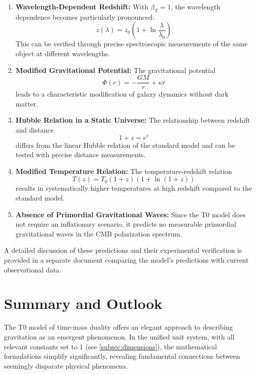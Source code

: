\documentclass[12pt,a4paper]{article}
\newcommand{\betaT}{\beta_{\text{T}}}
\begin{document}
	\begin{enumerate}
		\item \textbf{Wavelength-Dependent Redshift:} With \(\betaT = 1\), the wavelength dependence becomes particularly pronounced:
		\begin{equation}
			z(\lambda) = z_0 \left(1 + \ln \frac{\lambda}{\lambda_0}\right)
		\end{equation}
		This can be verified through precise spectroscopic measurements of the same object at different wavelengths.
		
		\item \textbf{Modified Gravitational Potential:} The gravitational potential 
		\begin{equation}
			\Phi(r) = -\frac{GM}{r} + \kappa r
		\end{equation}
		leads to a characteristic modification of galaxy dynamics without dark matter.
		
		\item \textbf{Hubble Relation in a Static Universe:} The relationship between redshift and distance
		\begin{equation}
			1 + z = e^{r}
		\end{equation}
		differs from the linear Hubble relation of the standard model and can be tested with precise distance measurements.
		
		\item \textbf{Modified Temperature Relation:} The temperature-redshift relation
		\begin{equation}
			T(z) = T_0 (1+z)(1 + \ln(1+z))
		\end{equation}
		results in systematically higher temperatures at high redshift compared to the standard model.
		
		\item \textbf{Absence of Primordial Gravitational Waves:} Since the T0 model does not require an inflationary scenario, it predicts no measurable primordial gravitational waves in the CMB polarization spectrum.
	\end{enumerate}
	
	A detailed discussion of these predictions and their experimental verification is provided in a separate document comparing the model's predictions with current observational data.
	
	\section{Summary and Outlook}
	\label{sec:summary}
	The T0 model of time-mass duality offers an elegant approach to describing gravitation as an emergent phenomenon. In the unified unit system, with all relevant constants set to 1 (see \cref{subsec:dimensions}), the mathematical formulations simplify significantly, revealing fundamental connections between seemingly disparate physical phenomena.
	
\end{document}
